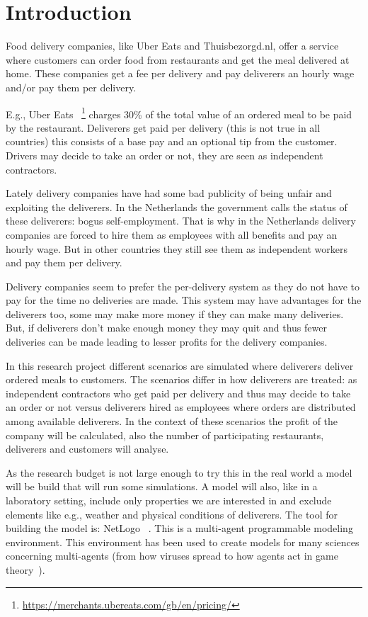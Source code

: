 
\section{Introduction}

Food delivery companies, like Uber Eats and Thuisbezorgd.nl, offer a service where customers can order food from restaurants and get the meal delivered at home.
These companies get a fee per delivery and pay deliverers an hourly wage and/or pay them per delivery.

E.g., Uber Eats ~\footnote{\url{https://merchants.ubereats.com/gb/en/pricing/}} charges 30\% of the total value of an ordered meal to be paid by the restaurant.
Deliverers get paid per delivery (this is not true in all countries) this consists of a base pay and an optional tip from the customer.
Drivers may decide to take an order or not, they are seen as independent contractors.

Lately delivery companies have had some bad publicity of being unfair and exploiting the deliverers.
In the Netherlands the government calls the status of these deliverers: bogus self-employment.
That is why in the Netherlands delivery companies are forced to hire them as employees with all benefits and pay an hourly wage.
But in other countries they still see them as independent workers and pay them per delivery.

Delivery companies seem to prefer the per-delivery system as they do not have to pay for the time no deliveries are made.
This system may have advantages for the deliverers too, some may make more money if they can make many deliveries.
But, if deliverers don't make enough money they may quit and thus fewer deliveries can be made leading to lesser profits for the delivery companies.

In this research project different scenarios are simulated where deliverers deliver ordered meals to customers.
The scenarios differ in how deliverers are treated: as independent contractors who get paid per delivery and thus may decide to take an order or not versus
deliverers hired as employees where orders are distributed among available deliverers.
In the context of these scenarios the profit of the company will be calculated, also the number of participating restaurants, deliverers and customers will analyse.

As the research budget is not large enough to try this in the real world a model will be build that will run some simulations.
A model will also, like in a laboratory setting, include only properties we are interested in and exclude elements like e.g., weather and physical conditions of deliverers.
The tool for building the model is: NetLogo ~\cite{NetLogo2024}.
This is a multi-agent programmable modeling environment.
This environment has been used to create models for many sciences concerning multi-agents (from how viruses spread to how agents act in game theory~\cite{r2019agent}).

